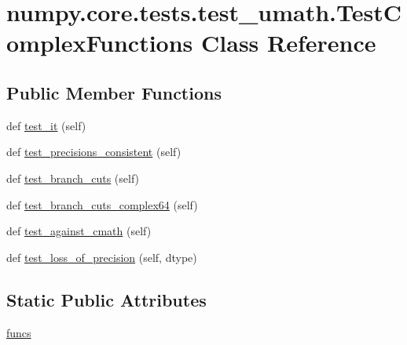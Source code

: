 \hypertarget{classnumpy_1_1core_1_1tests_1_1test__umath_1_1TestComplexFunctions}{}\section{numpy.\+core.\+tests.\+test\+\_\+umath.\+Test\+Complex\+Functions Class Reference}
\label{classnumpy_1_1core_1_1tests_1_1test__umath_1_1TestComplexFunctions}
\subsection*{Public Member Functions}
\begin{DoxyCompactItemize}
\item 
def \hyperlink{classnumpy_1_1core_1_1tests_1_1test__umath_1_1TestComplexFunctions_a7836b484805465dcd035545a47a76f43}{test\+\_\+it} (self)
\item 
def \hyperlink{classnumpy_1_1core_1_1tests_1_1test__umath_1_1TestComplexFunctions_ae21ee40522583442440c89462ef04407}{test\+\_\+precisions\+\_\+consistent} (self)
\item 
def \hyperlink{classnumpy_1_1core_1_1tests_1_1test__umath_1_1TestComplexFunctions_a2928708442b6b6428cb181649bbcb75f}{test\+\_\+branch\+\_\+cuts} (self)
\item 
def \hyperlink{classnumpy_1_1core_1_1tests_1_1test__umath_1_1TestComplexFunctions_a3138dcd1eeaa514093d70d95fe338ae1}{test\+\_\+branch\+\_\+cuts\+\_\+complex64} (self)
\item 
def \hyperlink{classnumpy_1_1core_1_1tests_1_1test__umath_1_1TestComplexFunctions_a17763f30629dc42d42d98895f7b9d2e4}{test\+\_\+against\+\_\+cmath} (self)
\item 
def \hyperlink{classnumpy_1_1core_1_1tests_1_1test__umath_1_1TestComplexFunctions_a82651b47f1308bf1707641cbc6720254}{test\+\_\+loss\+\_\+of\+\_\+precision} (self, dtype)
\end{DoxyCompactItemize}
\subsection*{Static Public Attributes}
\begin{DoxyCompactItemize}
\item 
\hyperlink{classnumpy_1_1core_1_1tests_1_1test__umath_1_1TestComplexFunctions_a997603a4be52d960807cf7e79851c7d1}{funcs}
\end{DoxyCompactItemize}


